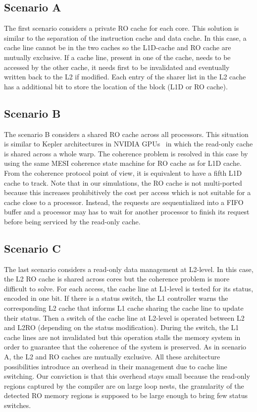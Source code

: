 \documentclass[sigconf]{acmart}
\begin{document}
\subsection{Scenario A}

The first scenario considers a private RO cache for each core. This solution is similar to the separation of the instruction cache and data cache. In this case, a cache line cannot be in the two caches so the L1D-cache and RO cache are mutually exclusive. If a cache line, present in one of the cache, needs to be accessed by the other cache, it needs first to be invalidated and eventually written back to the L2 if modified. Each entry of the sharer list in the L2 cache has a additional bit to store the location of the block (L1D or RO cache). 

\subsection{Scenario B}

The scenario B considers a shared RO cache across all processors. This situation is similar to Kepler architectures in NVIDIA GPUs~\cite{NVIDIA:2007} in which the read-only cache is shared across a whole warp. The coherence problem is resolved in this case by using the same MESI coherence state machine for RO cache as for L1D cache. From the coherence protocol point of view, it is equivalent to have a fifth L1D cache to track. Note that in our simulations, the RO cache is not multi-ported because this increases prohibitively the cost per access which is not suitable for a cache close to a processor. Instead, the requests are sequentialized into a FIFO buffer and a processor may has to wait for another processor to finish its request before being serviced by the read-only cache.


\subsection{Scenario C}
The last scenario considers a read-only data management at L2-level. In this case, the L2 RO cache is shared across cores but the coherence problem is more difficult to solve. For each access, the cache line at L1-level is tested for its status, encoded in one bit. If there is a status switch, the L1 controller warns the corresponding L2 cache that informs L1 cache sharing the cache line to update their status. Then a switch of the cache line at L2-level is operated between L2 and L2RO (depending on the status modification). During the switch, the L1 cache lines are not invalidated but this operation stalls the memory system in order to guarantee that the coherence of the system is preserved. As in scenario A, the L2 and RO caches are mutually exclusive. All these architecture possibilities introduce an overhead in their management due to cache line switching. Our conviction is that this overhead stays small because the read-only regions captured by the compiler are on large loop nests, the granularity of the detected RO memory regions is supposed to be large enough to bring few status switches.
\end{document}
